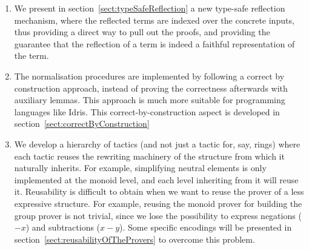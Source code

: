 \begin{enumerate}

\item We present in section~\ref{sect:typeSafeReflection} a new type-safe reflection mechanism, where the reflected terms are indexed over the concrete inputs, thus providing a direct way to pull out the proofs, and providing the guarantee that the reflection of a term is indeed a faithful representation of the term.

\item The normalisation procedures are implemented by following a correct by construction approach, instead of proving the correctness afterwards with auxiliary lemmas. This approach is much more suitable for programming languages like Idris. This correct-by-construction aspect is developed in section~\ref{sect:correctByConstruction}

\item We develop a hierarchy of tactics (and not just a tactic for, say, rings) where each tactic reuses the rewriting machinery of the structure from which it naturally inherits.
For example, simplifying neutral elements is only implemented at the monoid level, and each level inheriting from it will reuse it. Reusability is difficult to obtain when we want to reuse the prover of a less expressive structure. For example, reusing the monoid prover for building the
group prover is not trivial, since we lose the possibility to express
negations ($-x$) and subtractions ($x-y$). Some specific encodings
will be presented in section~\ref{sect:reusabilityOfTheProvers} to overcome this problem.

\end{enumerate}


